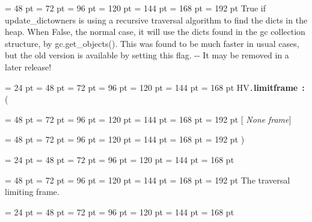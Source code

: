 {{{{\par \noindent  \leftskip = 48 pt  \leftmargini = 72 pt  \leftmarginii = 96 pt  \leftmarginiii = 120 pt  \leftmarginiv = 144 pt  \leftmarginv = 168 pt  \leftmarginvi = 192 pt 
True if update{\_}dictowners is using a recursive traversal algorithm to
find the dicts in the heap. When False, the normal case, it will use the
dicts found in the gc collection structure, by gc.get{\_}objects(). This was
found to be much faster in usual cases, but the old version is available
by setting this flag. -{}- It may be removed in a later release!

\par}
\par}
\par}
{\par \noindent  \leftskip = 24 pt  \leftmargini = 48 pt  \leftmarginii = 72 pt  \leftmarginiii = 96 pt  \leftmarginiv = 120 pt  \leftmarginv = 144 pt  \leftmarginvi = 168 pt HV{\tt .\/}{\bf {\large {\bf limitframe\/}}\/}~{\bf :}  ({\par \noindent
{\par \noindent  \leftskip = 48 pt  \leftmargini = 72 pt  \leftmarginii = 96 pt  \leftmarginiii = 120 pt  \leftmarginiv = 144 pt  \leftmarginv = 168 pt  \leftmarginvi = 192 pt {\bf {}\/}{[} {\em None\/}{\bf {}\/} {\em frame\/}]\par}
{\par \noindent  \leftskip = 48 pt  \leftmargini = 72 pt  \leftmarginii = 96 pt  \leftmarginiii = 120 pt  \leftmarginiv = 144 pt  \leftmarginv = 168 pt  \leftmarginvi = 192 pt  )\par}
\par}
\par}
{\par \noindent  \leftskip = 24 pt  \leftmargini = 48 pt  \leftmarginii = 72 pt  \leftmarginiii = 96 pt  \leftmarginiv = 120 pt  \leftmarginv = 144 pt  \leftmarginvi = 168 pt {\par \noindent
{\par \noindent  \leftskip = 48 pt  \leftmargini = 72 pt  \leftmarginii = 96 pt  \leftmarginiii = 120 pt  \leftmarginiv = 144 pt  \leftmarginv = 168 pt  \leftmarginvi = 192 pt  The traversal limiting frame.\par}
\par}
\par}
{\par \noindent  \leftskip = 24 pt  \leftmargini = 48 pt  \leftmarginii = 72 pt  \leftmarginiii = 96 pt  \leftmarginiv = 120 pt  \leftmarginv = 144 pt  \leftmarginvi = 168 pt {\par \noindent
}}}

